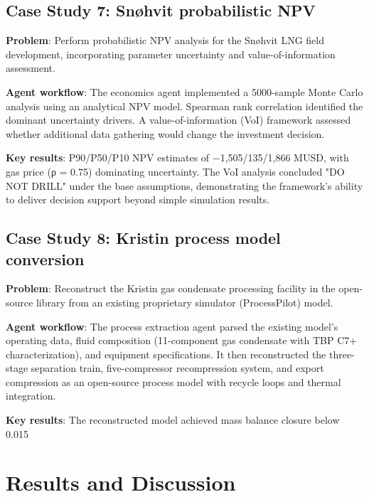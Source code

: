 \documentclass[review,3p]{elsarticle}
\begin{document}
\subsection{Case Study 7: Sn{\o}hvit probabilistic NPV}

\textbf{Problem}: Perform probabilistic NPV analysis for the Sn{\o}hvit LNG field development, incorporating parameter uncertainty and value-of-information assessment.

\textbf{Agent workflow}: The economics agent implemented a 5000-sample Monte Carlo analysis using an analytical NPV model. Spearman rank correlation identified the dominant uncertainty drivers. A value-of-information (VoI) framework assessed whether additional data gathering would change the investment decision.

\textbf{Key results}: P90/P50/P10 NPV estimates of −1,505/135/1,866 MUSD, with gas price (ρ = 0.75) dominating uncertainty. The VoI analysis concluded "DO NOT DRILL" under the base assumptions, demonstrating the framework's ability to deliver decision support beyond simple simulation results.

\subsection{Case Study 8: Kristin process model conversion}

\textbf{Problem}: Reconstruct the Kristin gas condensate processing facility in the open-source library from an existing proprietary simulator (ProcessPilot) model.

\textbf{Agent workflow}: The process extraction agent parsed the existing model's operating data, fluid composition (11-component gas condensate with TBP C7+ characterization), and equipment specifications. It then reconstructed the three-stage separation train, five-compressor recompression system, and export compression as an open-source process model with recycle loops and thermal integration.

\textbf{Key results}: The reconstructed model achieved mass balance closure below 0.015%


\section{Results and Discussion}
\end{document}
